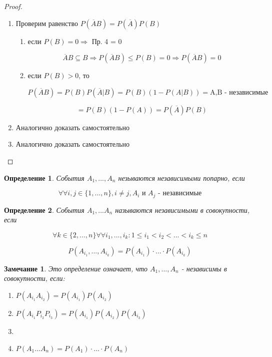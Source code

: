 \documentclass[a4paper, 14pt]{report}
\newtheorem{defenition}{Определение}[chapter]
\newtheorem{note}{Замечание}[chapter]
\begin{document}
\begin{proof}
    \begin{enumerate}
        \item Проверим равенство $P(\overline A B) = P(\overline A) P(B)$
        
            \begin{enumerate}
                \item если $P(B) = 0 \Rightarrow$ Пр. 4 = 0

                $$
                \overline A B \subseteq B \Rightarrow P(\overline A B) \le P(B) = 0 \Rightarrow P(\overline A B) = 0
                $$

            \item если $P(B) > 0$, то

                $$
                P(\overline A B) = P(B) P(\overline A | B) = P(B)(1-P(A|B)) = \text{A,B - независимые}
                $$

                $$
                = P(B)(1-P(A)) = P(\overline A)P(B)
                $$
            \end{enumerate}

        \item Аналогично доказать самостоятельно
        \item Аналогично доказать самостоятельно
    \end{enumerate}
\end{proof}

\begin{defenition}
    События $A_1,...,A_n$ незываются независимыми попарно, если

    $$
    \forall \forall i,j \in \{1,...,n\},i \ne j, A_i \text{ и } A_j \text{ - независимые}
    $$
\end{defenition}

\begin{defenition}
    События $A_1,...A_n$ называются независимыми в совокупности, если

    $$
    \forall k \in \{2,...,n\} \forall \forall i_1,...,i_k : 1 \le i_1 < i_2 < ... < i_k \le n
    $$

    $$
    P(A_{i_1},...,A_{i_k}) = P(A_{i_1}) \cdot ... \cdot P(A_{i_k})
    $$
\end{defenition}

\begin{note}
    Это определение означает, что $A_1,...,A_n$ - независимы в совокупности, если:

    \begin{enumerate}
        \item $P(A_{i_1} A_{i_2}) = P(A_{i_1})P(A_{i_2})$
        \item $P(A_{i_1} P_{i_2} P_{i_3}) = P(A_{i_1})P(A_{i_2}) P(A_{i_3})$
        \item[...]
        \item[n-1.] $ P(A_1 ... A_n) = P(A_1) \cdot ... \cdot P(A_n) $
    \end{enumerate}
\end{note}
\end{document}
